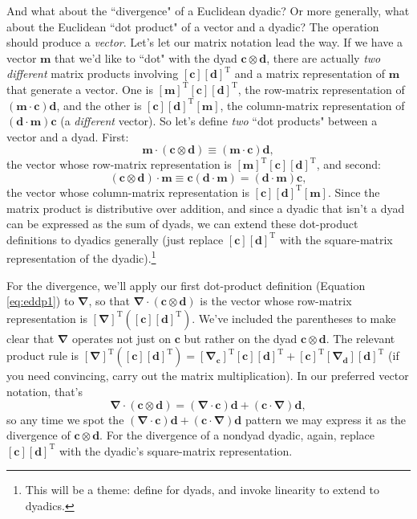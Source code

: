 \documentclass[12pt]{article}
\renewcommand{\vv}[1]{\mathbf{#1}}
\newcommand{\del}{\boldsymbol{\nabla}}
\begin{document}
And what about the ``divergence" of a Euclidean dyadic? Or more generally, what about the Euclidean ``dot product" of a vector and a dyadic? The operation should produce a \emph{vector}. Let's let our matrix notation lead the way. If we have a vector $\vv m$ that we'd like to ``dot" with the dyad $\vv c \otimes \vv d$, there are actually \emph{two different} matrix products involving $[\vv c][\vv d]^{\textrm{T}}$ and a matrix representation of $\vv m$ that generate a vector. One is $[\vv m]^{\mathrm{T}}[\vv c][\vv d]^{\textrm{T}}$, the row-matrix representation of $(\vv m \cdot \vv c) \vv d$, and the other is $[\vv c][\vv d]^{\textrm{T}}[\vv m]$, the column-matrix representation of $(\vv d \cdot \vv m) \vv c$ (a \emph{different} vector). So let's define \emph{two} ``dot products" between a vector and a dyad. First:
\begin{equation}\label{eq:eddp1}
\vv m \cdot (\vv c \otimes \vv d) \equiv (\vv m \cdot \vv c) \vv d,
\end{equation}
the vector whose row-matrix representation is $[\vv m]^{\mathrm{T}}[\vv c][\vv d]^{\textrm{T}}$, and second:
\begin{equation}\label{eq:eddp2}
(\vv c \otimes \vv d) \cdot \vv m \equiv \vv c (\vv d \cdot \vv m) = (\vv d \cdot \vv m) \vv c,
\end{equation}
the vector whose column-matrix representation is $[\vv c][\vv d]^{\textrm{T}}[\vv m]$. Since the matrix product is distributive over addition, and since a dyadic that isn't a dyad can be expressed as the sum of dyads, we can extend these dot-product definitions to dyadics generally (just replace $[\vv c][\vv d]^{\textrm{T}}$ with the square-matrix representation of the dyadic).\footnote{This will be a theme: define for dyads, and invoke linearity to extend to dyadics.}

For the divergence, we'll apply our first dot-product definition (Equation \ref{eq:eddp1}) to $\del$, so that $\del \cdot (\vv c \otimes \vv d)$ is the vector whose row-matrix representation is $[\del]^{\textrm{T}}([\vv c][\vv d]^{\textrm{T}})$. We've included the parentheses to make clear that $\del$ operates not just on $\vv c$ but rather on the dyad $\vv c \otimes \vv d$. The relevant product rule is $[\del]^{\textrm{T}}([\vv c][\vv d]^{\textrm{T}}) = [\del_{\vv c}]^{\textrm{T}}[\vv c][\vv d]^{\textrm{T}} + [\vv c]^{\textrm{T}}[\del_{\vv d}][\vv d]^{\textrm{T}}$ (if you need convincing, carry out the matrix multiplication). In our preferred vector notation, that's
\begin{equation}\label{eq:eddiv}
\del \cdot (\vv c \otimes \vv d) = (\del \cdot \vv c) \vv d + (\vv c \cdot \del) \vv d,
\end{equation}
so any time we spot the $(\del \cdot \vv c) \vv d + (\vv c \cdot \del) \vv d$ pattern we may express it as the divergence of $\vv c \otimes \vv d$. For the divergence of a nondyad dyadic, again, replace $[\vv c][\vv d]^{\textrm{T}}$ with the dyadic's square-matrix representation.
\end{document}
